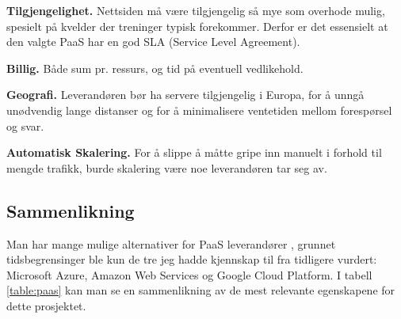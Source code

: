 \textbf{Tilgjengelighet.} Nettsiden må være tilgjengelig så mye som overhode mulig, spesielt på kvelder der treninger typisk forekommer. Derfor er det essensielt at den valgte PaaS har en god SLA (Service Level Agreement). 

\textbf{Billig.} Både sum pr. ressurs, og tid på eventuell vedlikehold.

\textbf{Geografi.} Leverandøren bør ha servere tilgjengelig i Europa, for å unngå unødvendig lange distanser og for å minimalisere ventetiden mellom forespørsel og svar.

\textbf{Automatisk Skalering.} For å slippe å måtte gripe inn manuelt i forhold til mengde trafikk, burde skalering være noe leverandøren tar seg av.

\subsection{Sammenlikning}
Man har mange mulige alternativer for PaaS leverandører \citep{pass:available}, grunnet tidsbegrensinger ble kun de tre jeg hadde kjennskap til fra tidligere vurdert: Microsoft Azure, Amazon Web Services og Google Cloud Platform. I tabell \ref{table:paas} kan man se en sammenlikning av de mest relevante egenskapene for dette prosjektet.


